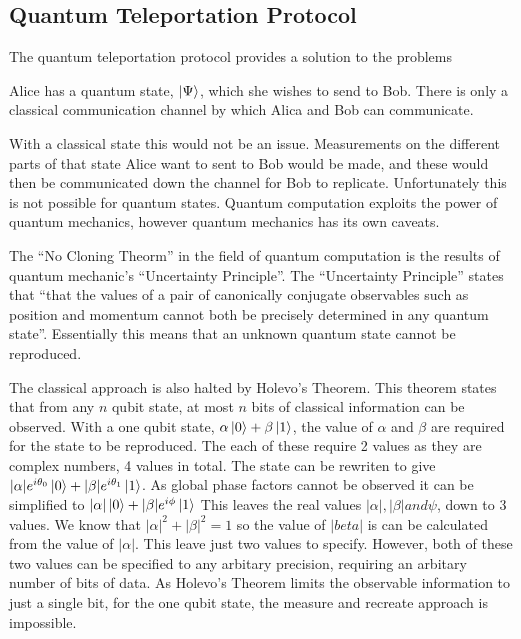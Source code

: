 \documentclass[authoryearcitations]{UoYCSproject}
\begin{document}
\subsection{Quantum Teleportation Protocol}

The quantum teleportation protocol provides a solution to the problems
\begin{center}
Alice has a quantum state, $\left\vert{\Psi}\right\rangle$, which she wishes to send to Bob.
There is only a classical communication channel by which Alica and Bob can communicate.
\end{center}

With a classical state this would not be an issue.
Measurements on the different parts of that state Alice want to sent to Bob would be made, and these would then be communicated down the channel for Bob to replicate.
Unfortunately this is not possible for quantum states.
Quantum computation exploits the power of quantum mechanics, however quantum mechanics has its own caveats.

The ``No Cloning Theorm'' in the field of quantum computation is the results of quantum mechanic's ``Uncertainty Principle''.
The ``Uncertainty Principle'' states that ``that
the values of a pair of canonically conjugate observables such as position and momentum cannot both
be precisely determined in any quantum state''\cite{uncerth}.
Essentially this means that an unknown quantum state cannot be reproduced.

The classical approach is also halted by Holevo's Theorem.
This theorem states that from any $n$ qubit state, at most $n$ bits of classical information can be observed.
With a one qubit state, $\alpha\left\vert{0}\right\rangle+\beta\left\vert{1}\right\rangle$, the value of $\alpha$ and $\beta$ are required for the state to be reproduced.
The each of these require 2 values as they are complex numbers, 4 values in total.
The state can be rewriten to give $|\alpha|e^{i\theta_0}\left\vert{0}\right\rangle+|\beta|e^{i\theta_1}\left\vert{1}\right\rangle$.
As global phase factors cannot be observed it can be simplified to $|\alpha|\left\vert{0}\right\rangle+|\beta|e^{i\phi}\left\vert{1}\right\rangle$
This leaves the real values $|\alpha|, |\beta| and \psi$, down to 3 values.
We know that $|\alpha|^2+|\beta|^2=1$ so the value of $|beta|$ is can be calculated from the value of $|\alpha|$.
This leave just two values to specify.
However, both of these two values can be specified to any arbitary precision, requiring an arbitary number of bits of data.
As Holevo's Theorem limits the observable information to just a single bit, for the one qubit state, the measure and recreate approach is impossible.
\end{document}

